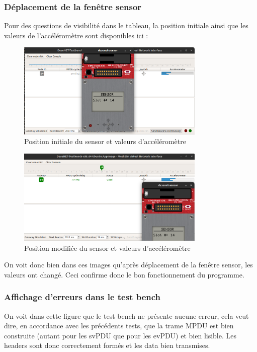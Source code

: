 \documentclass{report}
\begin{document}
\subsubsection{Déplacement de la fenêtre sensor}
\label{subsection:SensorMove}
Pour des questions de visibilité dans le tableau, la position initiale ainsi que les valeurs de l'accéléromètre sont disponibles ici :\\
\begin{figure}[H]
    \centering
    \includegraphics[width= 0.8\textwidth]{Images/SensorInitPos.png}
    \caption{Position initiale du sensor et valeurs d'accéléromètre}
    \label{fig:SensorInitPos}
\end{figure}
\begin{figure}[H]
    \centering
    \includegraphics[width= 0.8\textwidth]{Images/SensorPos2.png}
    \caption{Position modifiée du sensor et valeurs d'accéléromètre}
    \label{fig:SensorPos2}
\end{figure}
On voit donc bien dans ces images qu'après déplacement de la fenêtre sensor, les valeurs ont changé. Ceci confirme donc le bon fonctionnement du programme.
\subsubsection{Affichage d'erreurs dans le test bench}
\label{subsection:NoErrors}
On voit dans cette figure que le test bench ne présente aucune erreur, cela veut dire, en accordance avec les précédents tests, que la trame MPDU est bien construite (autant pour les svPDU que pour les evPDU) et bien lisible. Les headers sont donc correctement formés et les data bien transmises.
\end{document}
